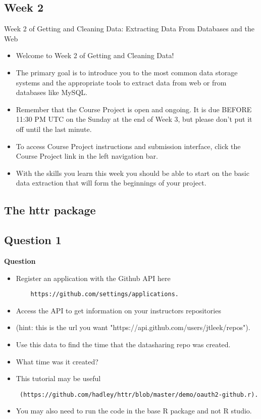 \documentclass[12pt]{article}
\begin{document}
\newpage
\subsection*{Week 2} 
Week 2 of Getting and Cleaning Data: Extracting Data From Databases and the Web

\begin{itemize}
\item Welcome to Week 2 of Getting and Cleaning Data! 

\item The primary goal is to introduce you to the most common data storage systems and the appropriate tools to extract data from web or from databases like MySQL. 

\item Remember that the Course Project is open and ongoing. It is due BEFORE 11:30 PM UTC on the Sunday at the end of Week 3, but please don't put it off until the last minute. 
\item To access Course Project instructions and submission interface, click the Course Project link in the left navigation bar.  


\item With the skills you learn this week you should be able to start on the basic data extraction that will form the beginnings of your project.
\end{itemize} 
\newpage
\subsection*{The httr package}
\newpage
\subsection*{Question 1}
\textbf{Question}
\begin{itemize}
	\item Register an application with the Github API here 
	\begin{verbatim}
	https://github.com/settings/applications. 
	\end{verbatim}
	\item Access the API to get information on your instructors repositories 
	\item (hint: this is the url you want "https://api.github.com/users/jtleek/repos"). \item Use this data to find the time that the datasharing repo was created. \item What time was it created?
	\item This tutorial may be useful
	\begin{verbatim} (https://github.com/hadley/httr/blob/master/demo/oauth2-github.r).
	\end{verbatim}
	\item You may also need to run the code in the base R package and not R studio.
\end{itemize}
\end{document}
